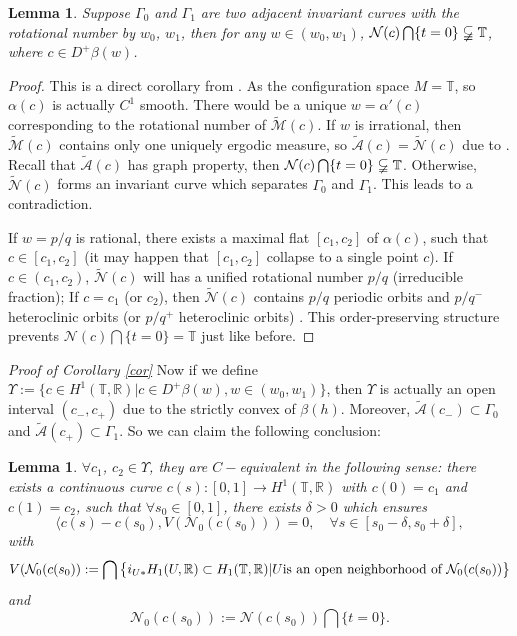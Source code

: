 \documentclass{amsart}
\newtheorem{lem}[thm]{Lemma}
\begin{document}
\begin{lem}\label{lem}
Suppose $\Gamma_0$ and $\Gamma_1$ are two adjacent invariant curves with the rotational number by $w_0$, $w_1$, then for any $w\in(w_0,w_1)$, $\mathcal{N}(c)\bigcap\{t=0\}\varsubsetneqq{\mathbb{T}}$, where $c\in D^+\beta(w)$.
\end{lem}
\begin{proof}
This is a direct corollary from \cite{Ma3}. As the configuration space $M={\mathbb{T}}$, so $\alpha(c)$ is actually $C^1$ smooth. There would be a unique $w=\alpha'(c)$ corresponding to the rotational number of $\widetilde{\mathcal{M}}(c)$. If $w$ is irrational, then $\widetilde{\mathcal{M}}(c)$ contains only one uniquely ergodic measure, so $\tilde{\mathcal{A}}(c)=\widetilde{\mathcal{N}}(c)$ due to \cite{B}. Recall that $\tilde{\mathcal{A}}(c)$ has graph property, then ${\mathcal{N}}(c)\bigcap\{t=0\}\varsubsetneqq{\mathbb{T}}$. Otherwise, $\widetilde{\mathcal{N}}(c)$ forms an invariant curve which separates $\Gamma_0$ and $\Gamma_1$. This leads to a contradiction.

If $w=p/q$ is rational, there exists a maximal flat $[c_1,c_2]$ of $\alpha(c)$, such that $c\in[c_1,c_2]$ (it may happen that $[c_1,c_2]$ collapse to a single point $c$). If $c\in(c_1,c_2)$, $\widetilde{\mathcal{N}}(c)$ will has a unified rotational number $p/q$ (irreducible fraction); If $c=c_1$ (or $c_2$), then $\widetilde{\mathcal{N}}(c)$ contains $p/q$ periodic orbits and $p/q^-$ heteroclinic orbits (or $p/q^+$ heteroclinic orbits) \cite{Ma3}. This order-preserving structure prevents $\mathcal{N}(c)\bigcap\{t=0\}={\mathbb{T}}$ just like before.\vspace{10pt}
 \end{proof}
{\it Proof of Corollary \ref{cor}\;} Now if we define $\Upsilon:=\{c\in H^1({\mathbb{T}},{\mathbb{R}})|c\in D^+\beta(w), w\in(w_0,w_1)\}$, then $\Upsilon$ is actually an open interval $(c_-,c_+)$ due to the strictly convex of $\beta(h)$. Moreover, $\tilde{\mathcal{A}}(c_-)\subset\Gamma_0$ and $\tilde{\mathcal{A}}(c_+)\subset\Gamma_1$. So we can claim the following conclusion:
\begin{lem}
$\forall c_1$, $c_2\in\Upsilon$, they are $C-$equivalent in the following sense: there exists a continuous curve $c(s):[0,1]\rightarrow H^1({\mathbb{T}},{\mathbb{R}})$ with $c(0)=c_1$ and $c(1)=c_2$, such that $\forall s_0\in[0,1]$, there exists $\delta>0$ which ensures
\[
\langle c(s)-c(s_0), V(\mathcal{N}_0(c(s_0)))=0, \quad\forall s\in[s_0-\delta,s_0+\delta],
\]
with
\[
V(\mathcal{N}_0(c(s_0)):=\bigcap\big{\{}i_{U*}H_1(U,{\mathbb{R}})\subset H_1({\mathbb{T}},{\mathbb{R}})|U \text{is an open neighborhood of }\mathcal{N}_0(c(s_0))\big{\}}
\]
and
\[
\mathcal{N}_0(c(s_0)):=\mathcal{N}(c(s_0))\bigcap\{t=0\}.
\]
\end{lem}
\end{document}
